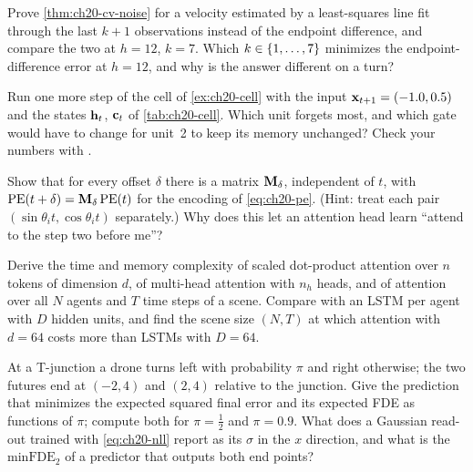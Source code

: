 \begin{exercise}[\difficulty{2}]
\label{exr:ch20-cv-noise}
Prove \cref{thm:ch20-cv-noise} for a velocity estimated by a least-squares
line fit through the last $k + 1$ observations instead of the endpoint
difference, and compare the two at $h = 12$, $k = 7$. Which $k \in \left\{ 1,
\dots, 7 \right\}$ minimizes the endpoint-difference error at $h = 12$, and why is
the answer different on a turn?
\end{exercise}

\begin{exercise}[\difficulty{2}]
\label{exr:ch20-cell-hand}
Run one more step of the cell of \cref{ex:ch20-cell} with the input
$\mathbf{x}_{t+1} = (-1.0, 0.5)$ and the states $\mathbf{h}_t$, $\mathbf{c}_t$ of
\cref{tab:ch20-cell}. Which unit forgets most, and which gate would have to
change for unit~2 to keep its memory unchanged? Check your numbers with
.
\end{exercise}

\begin{exercise}[\difficulty{2}]
\label{exr:ch20-pe}
Show that for every offset $\delta$ there is a matrix $\mathbf{M}_\delta$,
independent of $t$, with $\mathrm{PE}(t + \delta) = \mathbf{M}_\delta\,\mathrm{PE}(t)$
for the encoding of \cref{eq:ch20-pe}. (Hint: treat each pair
$(\sin\theta_i t, \cos\theta_i t)$ separately.) Why does this let an
attention head learn ``attend to the step two before me''?
\end{exercise}

\begin{exercise}[\difficulty{2}]
\label{exr:ch20-attention-complexity}
Derive the time and memory complexity of scaled dot-product attention over
$n$ tokens of dimension $d$, of multi-head attention with $n_h$ heads, and of
attention over all $N$ agents and $T$ time steps of a scene. Compare with an
LSTM per agent with $D$ hidden units, and find the scene size $(N, T)$ at which
attention with $d = 64$ costs more than LSTMs with $D = 64$.
\end{exercise}

\begin{exercise}[\difficulty{2}]
\label{exr:ch20-conditional-mean}
At a T-junction a drone turns left with probability $\pi$ and right
otherwise; the two futures end at $(-2, 4)$ and $(2, 4)$ relative to the
junction. Give the prediction that minimizes the expected squared final
error and its expected FDE as functions of $\pi$; compute both for
$\pi = \tfrac12$ and $\pi = 0.9$. What does a Gaussian read-out trained with
\cref{eq:ch20-nll} report as its $\sigma$ in the $x$ direction, and what is
the $\mathrm{minFDE}_2$ of a predictor that outputs both end points?
\end{exercise}


